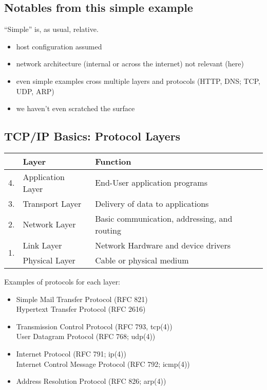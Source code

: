 \documentclass[xga]{xdvislides}
\begin{document}
\subsection{Notables from this simple example}
``Simple'' is, as usual, relative.
\\

\begin{itemize}
	\item host configuration assumed
	\item network architecture (internal or across the internet) not
			relevant (here)
	\item even simple examples cross multiple layers and protocols
			(HTTP, DNS; TCP, UDP, ARP)
	\item we haven't even scratched the surface
\end{itemize}

\subsection{TCP/IP Basics: Protocol Layers}
\begin{center}
	\begin{tabular}{|cl|l|}
	\hline
	& {\bf Layer} & {\bf Function} \\
	\hline
	4. & Application Layer & End-User application programs \\
	3. & Transport Layer & Delivery of data to applications \\
	2. & Network Layer & Basic communication, addressing, and routing \\
	\multirow{2}{*}{1.} & Link Layer & Network Hardware and device drivers \\
	& Physical Layer & Cable or physical medium \\
	\hline
	\end{tabular}
\end{center}
\addvspace{.5in}
Examples of protocols for each layer:
\begin{itemize}
	\item Simple Mail Transfer Protocol (RFC 821) \\
		Hypertext Transfer Protocol (RFC 2616)
	\item Transmission Control Protocol (RFC 793, tcp(4)) \\
		User Datagram Protocol (RFC 768; udp(4))
	\item Internet Protocol (RFC 791; ip(4)) \\
		Internet Control Message Protocol (RFC 792; icmp(4))
	\item Address Resolution Protocol (RFC 826; arp(4))
\end{itemize}
\end{document}
